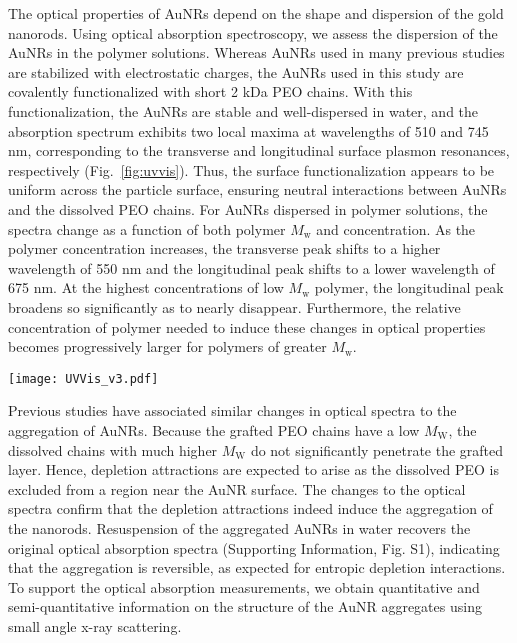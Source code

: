 \documentclass[journal=jacsat, superscriptaddress]{achemso}
\def\EDITS#1{{\color{black}#1}}
\def\EDITS#1{#1}
\begin{document}
The optical properties of AuNRs depend on the shape and dispersion of the gold nanorods. Using optical absorption spectroscopy, we assess the dispersion of the AuNRs in the polymer solutions. Whereas AuNRs used in many previous studies are stabilized with electrostatic charges\cite{Orendorff2005,Park2010b,Choi2011}, the AuNRs used in this study are covalently functionalized with short 2 kDa PEO chains. With this functionalization, the AuNRs are stable and well-dispersed in water, and the absorption spectrum exhibits two local maxima at wavelengths of 510 and 745 nm, corresponding to the transverse and longitudinal surface plasmon resonances, respectively (Fig.\ \ref{fig:uvvis}). Thus, the surface functionalization appears to be uniform across the particle surface, ensuring neutral interactions between AuNRs and the dissolved PEO chains. For AuNRs dispersed in polymer solutions, the spectra change as a function of both polymer $M_\mathrm{w}$ and concentration. As the polymer concentration increases, the transverse peak shifts to a higher wavelength of 550 nm and the longitudinal peak shifts to a lower wavelength of 675 nm. At the highest concentrations of low $M_\mathrm{w}$ polymer, the longitudinal peak broadens so significantly as to nearly disappear. Furthermore, the relative concentration of polymer needed to induce these changes in optical properties becomes progressively larger for polymers of greater $M_\mathrm{w}$. 

\begin{figure*}[b!]
\texttt{[image: UVVis\_v3.pdf]}
\caption{\label{fig:uvvis} \EDITS{Optical absorption} spectra for suspensions of AuNRs in solutions of (a) 35 kDa, (b) 100 kDa, (c) 200 kDa, (d) 400 kDa, and (e) 1000 kDa PEO at various concentrations. Curves are shifted vertically to overlap at 450 nm.}
\end{figure*}

Previous studies have associated similar changes in optical spectra to the aggregation of AuNRs.\cite{Tam2010,Jiang2012,Chen2013,Wang2014} Because the grafted PEO chains have a low $M_\mathrm{W}$, the dissolved chains with much higher $M_\mathrm{W}$ do not significantly penetrate the grafted layer. \cite{Stiakakis2002, Wilk2010, Poling-Skutvik2017} Hence, depletion attractions are expected to arise as the dissolved PEO is excluded from a region near the AuNR surface. The changes to the optical spectra confirm that the depletion attractions indeed induce the aggregation of the nanorods. \EDITS{Resuspension of the aggregated AuNRs in water recovers the original optical absorption spectra (Supporting Information, Fig. S1), indicating that the aggregation is reversible, as expected for entropic depletion interactions.} \EDITS{To support the optical absorption measurements, we obtain quantitative and semi-quantitative information on the structure of the AuNR aggregates using small angle x-ray scattering.} 
\end{document}
